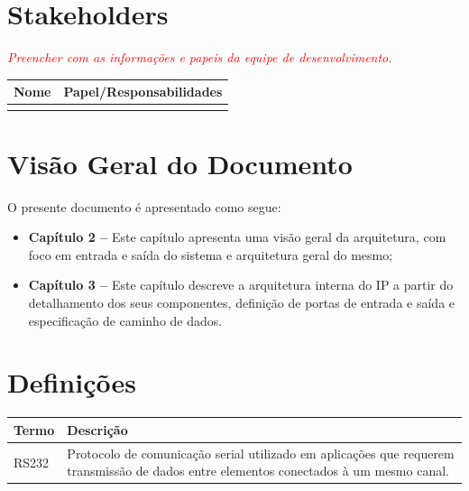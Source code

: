 \documentclass{report}
\begin{document}
  \section{Stakeholders}
    \textcolor{red}{\textit{Preencher com as informações e papeis da equipe de desenvolvimento.}}
    \FloatBarrier
    \begin{table}[H] 
      \begin{center}
        \begin{tabular}[pos]{|m{6cm} | m{8cm}|} 
          \hline 
          \cellcolor[gray]{0.9}\textbf{Nome} & \cellcolor[gray]{0.9}\textbf{Papel/Responsabilidades} \\ \hline
           &  \\ \hline
        \end{tabular}
      \end{center}
    \end{table} 

\section{Visão Geral do Documento}

O presente documento é apresentado como segue:

  \begin{itemize}
   \item \textbf{Capítulo 2 --} Este capítulo apresenta uma visão geral da arquitetura, com foco em entrada e saída do sistema e arquitetura geral do mesmo;
   \item \textbf{Capítulo 3 --} Este capítulo descreve a arquitetura interna do IP a partir do detalhamento dos seus componentes, definição de portas de entrada e saída e especificação de caminho de dados.
  \end{itemize}


  \section{Definições}
    \FloatBarrier
    \begin{table}[H]
      \begin{center}
        \begin{tabular}[pos]{|m{5cm} | m{9cm}|} 
          \hline
          \cellcolor[gray]{0.9}\textbf{Termo} & \cellcolor[gray]{0.9}\textbf{Descrição} \\ \hline
          RS232                & Protocolo de comunicação serial utilizado em aplicações que requerem transmissão de dados entre elementos conectados à um mesmo canal.                    \\ \hline
        \end{tabular}
      \end{center}
    \end{table}  
\end{document}
